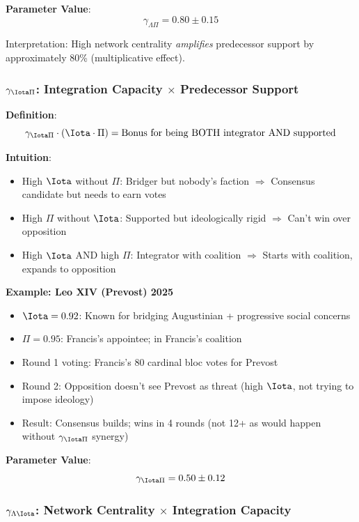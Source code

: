 \textbf{Parameter Value}:
$$\gamma_{\Lambda\Pi} = 0.80 \pm 0.15$$

Interpretation: High network centrality \textit{amplifies} predecessor support by approximately 80\% (multiplicative effect).

\subsubsection{$\gamma_{\Iota\Pi}$: Integration Capacity $\times$ Predecessor Support}

\textbf{Definition}:
$$\gamma_{\Iota\Pi} \cdot (\Iota \cdot \Pi) = \text{Bonus for being BOTH integrator AND supported}$$

\textbf{Intuition}:

\begin{itemize}
\item High $\Iota$ without $\Pi$: Bridger but nobody's faction $\Rightarrow$ Consensus candidate but needs to earn votes
\item High $\Pi$ without $\Iota$: Supported but ideologically rigid $\Rightarrow$ Can't win over opposition
\item High $\Iota$ AND high $\Pi$: Integrator with coalition $\Rightarrow$ Starts with coalition, expands to opposition
\end{itemize}

\textbf{Example: Leo XIV (Prevost) 2025}

\begin{itemize}
\item $\Iota = 0.92$: Known for bridging Augustinian + progressive social concerns
\item $\Pi = 0.95$: Francis's appointee; in Francis's coalition
\item Round 1 voting: Francis's 80 cardinal bloc votes for Prevost
\item Round 2: Opposition doesn't see Prevost as threat (high $\Iota$, not trying to impose ideology)
\item Result: Consensus builds; wins in 4 rounds (not 12+ as would happen without $\gamma_{\Iota\Pi}$ synergy)
\end{itemize}

\textbf{Parameter Value}:
$$\gamma_{\Iota\Pi} = 0.50 \pm 0.12$$

\subsubsection{$\gamma_{\Lambda\Iota}$: Network Centrality $\times$ Integration Capacity}

